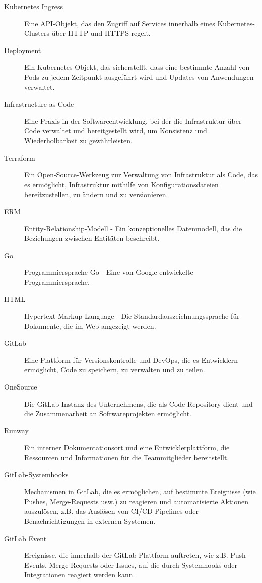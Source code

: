 \begin{description}
    \item[\hypertarget{KubernetesIngress}{Kubernetes Ingress}] Eine API-Objekt, das den Zugriff auf Services innerhalb eines Kubernetes-Clusters über HTTP und HTTPS regelt.
    \item[\hypertarget{Deployment}{Deployment}] Ein Kubernetes-Objekt, das sicherstellt, dass eine bestimmte Anzahl von Pods zu jedem Zeitpunkt ausgeführt wird und Updates von Anwendungen verwaltet.
    \item[\hypertarget{InfrastructureAsCode}{Infrastructure as Code}] Eine Praxis in der Softwareentwicklung, bei der die Infrastruktur über Code verwaltet und bereitgestellt wird, um Konsistenz und Wiederholbarkeit zu gewährleisten.
    \item[\hypertarget{Terraform}{Terraform}] Ein Open-Source-Werkzeug zur Verwaltung von Infrastruktur als Code, das es ermöglicht, Infrastruktur mithilfe von Konfigurationsdateien bereitzustellen, zu ändern und zu versionieren.
    \item[\hypertarget{ERM}{ERM}] Entity-Relationship-Modell - Ein konzeptionelles Datenmodell, das die Beziehungen zwischen Entitäten beschreibt.
    \item[\hypertarget{Go}{Go}] Programmiersprache Go - Eine von Google entwickelte Programmiersprache.
    \item[\hypertarget{HTML}{HTML}] Hypertext Markup Language - Die Standardauszeichnungssprache für Dokumente, die im Web angezeigt werden.
    \item[\hypertarget{GitLab}{GitLab}] Eine Plattform für Versionskontrolle und DevOps, die es Entwicklern ermöglicht, Code zu speichern, zu verwalten und zu teilen.
    \item[\hypertarget{OneSource}{OneSource}] Die GitLab-Instanz des Unternehmens, die als Code-Repository dient und die Zusammenarbeit an Softwareprojekten ermöglicht.
    \item[\hypertarget{Runway}{Runway}] Ein interner Dokumentationsort und eine Entwicklerplattform, die Ressourcen und Informationen für die Teammitglieder bereitstellt.
    \item[\hypertarget{GitLabSystemhooks}{GitLab-Systemhooks}] Mechanismen in GitLab, die es ermöglichen, auf bestimmte Ereignisse (wie Pushes, Merge-Requests usw.) zu reagieren und automatisierte Aktionen auszulösen, z.B. das Auslösen von CI/CD-Pipelines oder Benachrichtigungen in externen Systemen.
    \item[\hypertarget{GitLabEvent}{GitLab Event}] Ereignisse, die innerhalb der GitLab-Plattform auftreten, wie z.B. Push-Events, Merge-Requests oder Issues, auf die durch Systemhooks oder Integrationen reagiert werden kann.

\end{description}
